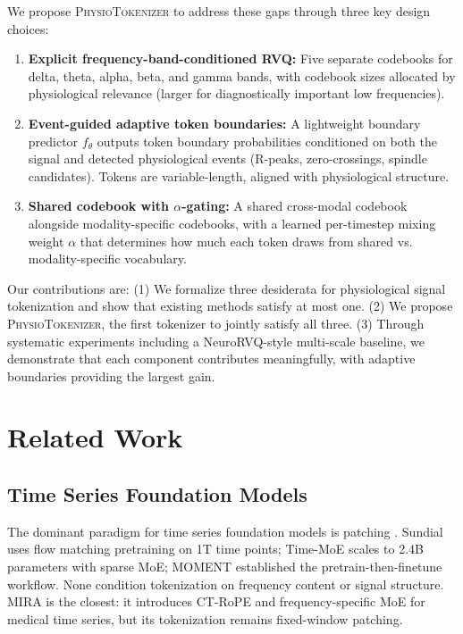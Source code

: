 \documentclass[letterpaper]{article}
\begin{document}
We propose \textsc{PhysioTokenizer} to address these gaps through three key
design choices:

\begin{enumerate}
    \item \textbf{Explicit frequency-band-conditioned RVQ:} Five separate
    codebooks for delta, theta, alpha, beta, and gamma bands, with codebook
    sizes allocated by physiological relevance (larger for diagnostically
    important low frequencies).

    \item \textbf{Event-guided adaptive token boundaries:} A lightweight
    boundary predictor $f_\theta$ outputs token boundary probabilities
    conditioned on both the signal and detected physiological events
    (R-peaks, zero-crossings, spindle candidates). Tokens are variable-length,
    aligned with physiological structure.

    \item \textbf{Shared codebook with $\alpha$-gating:} A shared cross-modal
    codebook alongside modality-specific codebooks, with a learned per-timestep
    mixing weight $\alpha$ that determines how much each token draws from shared
    vs. modality-specific vocabulary.
\end{enumerate}

Our contributions are: (1) We formalize three desiderata for physiological
signal tokenization and show that existing methods satisfy at most one.
(2) We propose \textsc{PhysioTokenizer}, the first tokenizer to jointly
satisfy all three. (3) Through systematic experiments including a
NeuroRVQ-style multi-scale baseline, we demonstrate that each component
contributes meaningfully, with adaptive boundaries providing the largest gain.


\section{Related Work}

\subsection{Time Series Foundation Models}

The dominant paradigm for time series foundation models is patching
\cite{nie2022patchtst}. Sundial \cite{liu2025sundial} uses flow matching
pretraining on 1T time points; Time-MoE \cite{shi2024time} scales to 2.4B
parameters with sparse MoE; MOMENT \cite{goswami2024moment} established the
pretrain-then-finetune workflow. None condition tokenization on frequency
content or signal structure. MIRA \cite{mira2025} is the closest: it introduces
CT-RoPE and frequency-specific MoE for medical time series, but its
tokenization remains fixed-window patching.
\end{document}
